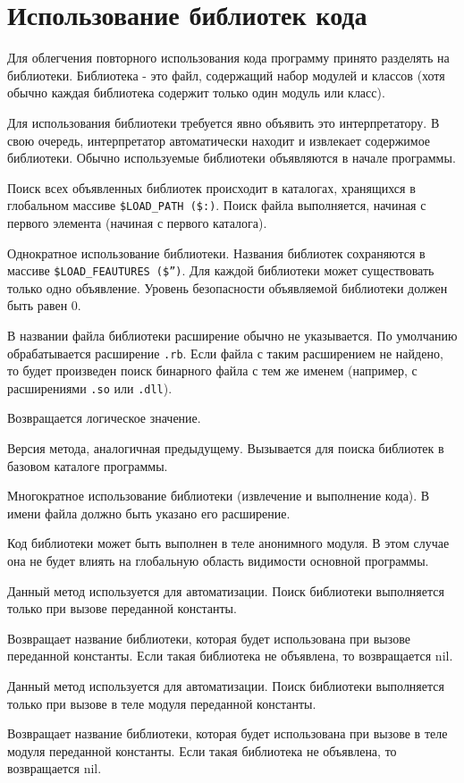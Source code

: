 \chapter{Использование библиотек кода}

Для облегчения повторного использования кода программу принято разделять на библиотеки. Библиотека - это файл, содержащий набор модулей и классов (хотя обычно каждая библиотека содержит только один модуль или класс).

Для использования библиотеки требуется явно объявить это интерпретатору. В свою очередь, интерпретатор автоматически находит и извлекает содержимое библиотеки. Обычно используемые библиотеки объявляются в начале программы.

Поиск всех объявленных библиотек происходит в каталогах, хранящихся в глобальном массиве \verb!$LOAD_PATH ($:)!. Поиск файла выполняется, начиная с первого элемента (начиная с первого каталога).

\begin{methodlist}
  Однократное использование библиотеки. Названия библиотек сохраняются в массиве \verb!$LOAD_FEAUTURES ($”)!. Для каждой библиотеки может существовать только одно объявление. Уровень безопасности объявляемой библиотеки должен быть равен 0.

  В названии файла библиотеки расширение обычно не указывается. По умолчанию обрабатывается расширение \verb!.rb!. Если файла с таким расширением не найдено, то будет произведен поиск бинарного файла с тем же именем (например, с расширениями \verb!.so! или \verb!.dll!).
   
  Возвращается логическое значение. 

  Версия метода, аналогичная предыдущему. Вызывается для поиска библиотек в базовом каталоге программы.
 
  Многократное использование библиотеки (извлечение и выполнение кода). В имени файла должно быть указано его расширение.

  Код библиотеки может быть выполнен в теле анонимного модуля. В этом случае она не будет влиять на глобальную область видимости основной программы. 
 
  Данный метод используется для автоматизации. Поиск библиотеки выполняется только при вызове переданной константы.
 
  Возвращает название библиотеки, которая будет использована при вызове переданной константы. Если такая библиотека не объявлена, то возвращается nil. 
 
  Данный метод используется для автоматизации. Поиск библиотеки выполняется только при вызове в теле модуля переданной константы.
 
  Возвращает название библиотеки, которая будет использована при вызове в теле модуля переданной константы. Если такая библиотека не объявлена, то возвращается nil.
\end{methodlist}